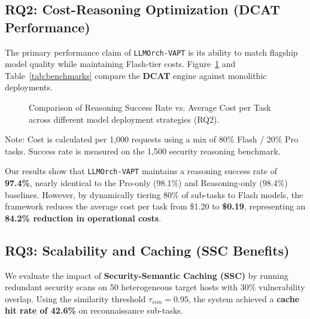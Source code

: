 

\subsection{RQ2: Cost-Reasoning Optimization (DCAT Performance)}
The primary performance claim of \texttt{LLMOrch-VAPT} is its ability to match flagship model quality while maintaining Flash-tier costs. Figure~\ref{fig:eval_metrics} and Table~\ref{tab:benchmarks} compare the \textbf{DCAT} engine against monolithic deployments.

\begin{figure}[!t]
    \centering
    \resizebox{0.85\columnwidth}{!}{
        
    }
    \caption{Comparison of Reasoning Success Rate vs. Average Cost per Task across different model deployment strategies (RQ2).}
    \label{fig:eval_metrics}
\end{figure}

\begin{table}[!t]
    \centering
    \caption{LLM Provider Performance Benchmarks for Security Reasoning}
    \label{tab:benchmarks}
    \resizebox{0.8\textwidth}{!}{
        
    }
    \vspace{1mm}
    \footnotesize{Note: Cost is calculated per 1,000 requests using a mix of 80\% Flash / 20\% Pro tasks. Success rate is measured on the 1,500 security reasoning benchmark.}
\end{table}

Our results show that \texttt{LLMOrch-VAPT} maintains a reasoning success rate of \textbf{97.4\%}, nearly identical to the Pro-only (98.1\%) and Reasoning-only (98.4\%) baselines. However, by dynamically tiering 80\% of sub-tasks to Flash models, the framework reduces the average cost per task from \$1.20 to \textbf{\$0.19}, representing an \textbf{84.2\% reduction in operational costs}.

\subsection{RQ3: Scalability and Caching (SSC Benefits)}
We evaluate the impact of \textbf{Security-Semantic Caching (SSC)} by running redundant security scans on 50 heterogeneous target hosts with 30\% vulnerability overlap. Using the similarity threshold $\tau_{sim} = 0.95$, the system achieved a \textbf{cache hit rate of 42.6\%} on reconnaissance sub-tasks.

